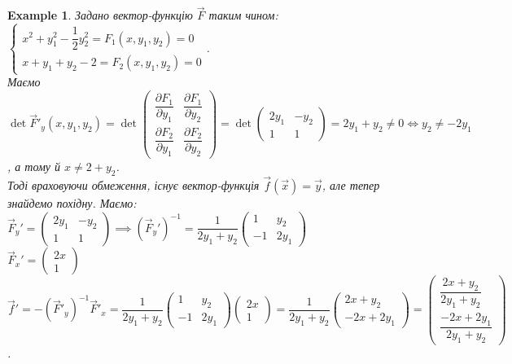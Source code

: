 \documentclass[a4paper, 10pt]{article}
\def\departial#1#2{\dfrac{\partial {#1}}{\partial {#2}}}
\theoremstyle{theoremdd}
\theoremstyle{theoremdd}
\theoremstyle{theoremdd}
\theoremstyle{theoremdd}
\theoremstyle{theoremdd}
\newtheorem{example}[theorem]{Example}
\theoremstyle{theoremdd}
\theoremstyle{theoremdd}
\theoremstyle{theoremdd}
\theoremstyle{theoremdd}
\begin{document}
\begin{example}
Задано вектор-функцію $\vec{F}$ таким чином: $\begin{cases}
x^2+y_1^2 - \dfrac{1}{2}y_2^2 = F_1(x,y_1,y_2) = 0 \\
x+y_1+y_2-2 = F_2(x,y_1,y_2) = 0
\end{cases}$.\\
Маємо $\det \vec{F}'_y(x,y_1,y_2) = \det \begin{pmatrix}
\departial{F_1}{y_1} & \departial{F_1}{y_2} \\
\departial{F_2}{y_1} & \departial{F_2}{y_2} 
\end{pmatrix} = \det \begin{pmatrix}
2y_1 & -y_2 \\
1 & 1
\end{pmatrix} = 2y_1 + y_2 \neq 0 \iff y_2 \neq -2y_1$, а тому й $x \neq 2+y_2$.\\
Тоді враховуючи обмеження, існує вектор-функція $\vec{f}(\vec{x}) = \vec{y}$, але тепер знайдемо похідну. Маємо: \\
$\vec{F}_y' = \begin{pmatrix}
2y_1 & -y_2 \\
1 & 1
\end{pmatrix} \implies (\vec{F}_y')^{-1} = \dfrac{1}{2y_1+y_2} \begin{pmatrix}
1 & y_2 \\
-1 & 2y_1
\end{pmatrix}$\\
$\vec{F}_x' = \begin{pmatrix}
2x \\ 1
\end{pmatrix}$\\
$\vec{f}' = -(\vec{F}'_y)^{-1} \vec{F}'_x = \dfrac{1}{2y_1+y_2} \begin{pmatrix}
1 & y_2 \\
-1 & 2y_1
\end{pmatrix} \begin{pmatrix}
2x \\ 1
\end{pmatrix} = \dfrac{1}{2y_1+y_2} \begin{pmatrix}
2x + y_2 \\ -2x + 2y_1
\end{pmatrix} = \begin{pmatrix}
\dfrac{2x+y_2}{2y_1+y_2} \\ \dfrac{-2x+2y_1}{2y_1+y_2}
\end{pmatrix}$.
\begin{figure}[H]

\end{figure}
\end{example}
\end{document}

